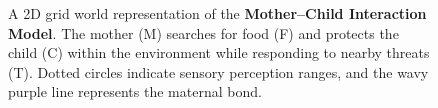 \begin{figure}[H]
\begin{tikzpicture}[scale=0.8]
\end{tikzpicture}

\caption{A 2D grid world representation of the \textbf{Mother–Child Interaction Model}. 
The mother (M) searches for food (F) and protects the child (C) within the environment while responding to nearby threats (T). 
Dotted circles indicate sensory perception ranges, and the wavy purple line represents the maternal bond.}
\label{fig:gridworld_mother_child}
\end{figure}

